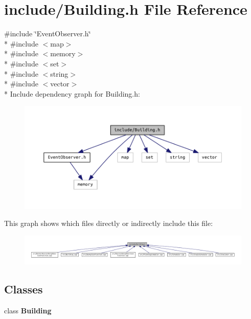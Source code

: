 \section{include/\+Building.h File Reference}
\label{_building_8h}
{\ttfamily \#include \char`\"{}Event\+Observer.\+h\char`\"{}}\\*
{\ttfamily \#include $<$map$>$}\\*
{\ttfamily \#include $<$memory$>$}\\*
{\ttfamily \#include $<$set$>$}\\*
{\ttfamily \#include $<$string$>$}\\*
{\ttfamily \#include $<$vector$>$}\\*
Include dependency graph for Building.\+h\+:
\nopagebreak
\begin{figure}[H]
\begin{center}
\leavevmode
\includegraphics[width=350pt]{_building_8h__incl}
\end{center}
\end{figure}
This graph shows which files directly or indirectly include this file\+:
\nopagebreak
\begin{figure}[H]
\begin{center}
\leavevmode
\includegraphics[width=350pt]{_building_8h__dep__incl}
\end{center}
\end{figure}
\subsection*{Classes}
\begin{DoxyCompactItemize}
\item 
class {\bf Building}
\end{DoxyCompactItemize}
